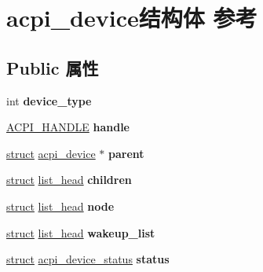 \hypertarget{structacpi__device}{}\section{acpi\+\_\+device结构体 参考}
\label{structacpi__device}
\subsection*{Public 属性}
\begin{DoxyCompactItemize}
\item 
\mbox{\label{structacpi__device_a4725bbef5323e41effd8627244524710}} 
int {\bfseries device\+\_\+type}
\item 
\mbox{\label{structacpi__device_ab071832e164f53b07f2d0310d66296a4}} 
\hyperlink{interfacevoid}{A\+C\+P\+I\+\_\+\+H\+A\+N\+D\+LE} {\bfseries handle}
\item 
\mbox{\label{structacpi__device_a8e147adf42f5a08de0973a5f42ec8d5f}} 
\hyperlink{interfacestruct}{struct} \hyperlink{structacpi__device}{acpi\+\_\+device} $\ast$ {\bfseries parent}
\item 
\mbox{\label{structacpi__device_a327968dacbf92ec2f9a7d0e0cdb28e9d}} 
\hyperlink{interfacestruct}{struct} \hyperlink{structlist__head}{list\+\_\+head} {\bfseries children}
\item 
\mbox{\label{structacpi__device_a883d45898d289aabb152b3c03c6934da}} 
\hyperlink{interfacestruct}{struct} \hyperlink{structlist__head}{list\+\_\+head} {\bfseries node}
\item 
\mbox{\label{structacpi__device_a6ef271b08f1edcddc6fb9be589664113}} 
\hyperlink{interfacestruct}{struct} \hyperlink{structlist__head}{list\+\_\+head} {\bfseries wakeup\+\_\+list}
\item 
\mbox{\label{structacpi__device_a97964ca2aa44e0f8be1dab424a1d8429}} 
\hyperlink{interfacestruct}{struct} \hyperlink{structacpi__device__status}{acpi\+\_\+device\+\_\+status} {\bfseries status}
\item 
\mbox{\label{structacpi__device_af7c6df496a4635cd63cbc380832cd268}} 

\end{DoxyCompactItemize}
